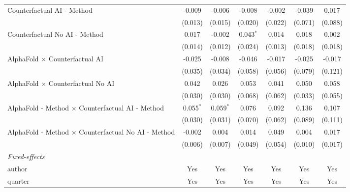 \begin{tabular}{lcccccc}
   Counterfactual AI - Method                                 & -0.009      & -0.006      & -0.008      & -0.002  & -0.039       & 0.017\\   
                                                              & (0.013)     & (0.015)     & (0.020)     & (0.022) & (0.071)      & (0.088)\\   
   Counterfactual No AI - Method                              & 0.017       & -0.002      & 0.043$^{*}$ & 0.014   & 0.018        & 0.002\\   
                                                              & (0.014)     & (0.012)     & (0.024)     & (0.013) & (0.018)      & (0.018)\\   
   AlphaFold $\times$ Counterfactual AI                       & -0.025      & -0.008      & -0.046      & -0.017  & -0.025       & -0.017\\   
                                                              & (0.035)     & (0.034)     & (0.058)     & (0.056) & (0.079)      & (0.121)\\   
   AlphaFold $\times$ Counterfactual No AI                    & 0.042       & 0.026       & 0.053       & 0.041   & 0.050        & 0.058\\   
                                                              & (0.030)     & (0.030)     & (0.068)     & (0.062) & (0.033)      & (0.055)\\   
   AlphaFold - Method $\times$ Counterfactual AI - Method     & 0.055$^{*}$ & 0.059$^{*}$ & 0.076       & 0.092   & 0.136        & 0.107\\   
                                                              & (0.030)     & (0.031)     & (0.070)     & (0.062) & (0.089)      & (0.111)\\   
   AlphaFold - Method $\times$ Counterfactual No AI - Method  & -0.002      & 0.004       & 0.014       & 0.049   & 0.004        & 0.017\\   
                                                              & (0.006)     & (0.007)     & (0.049)     & (0.054) & (0.010)      & (0.017)\\   
   \midrule
   \emph{Fixed-effects}\\
   author                                                     & Yes         & Yes         & Yes         & Yes     & Yes          & Yes\\  
   quarter                                                    & Yes         & Yes         & Yes         & Yes     & Yes          & Yes\\  

\end{tabular}
